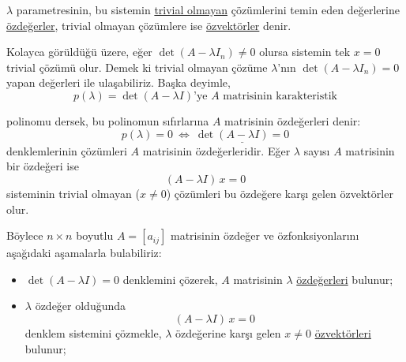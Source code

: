 \documentclass[11pt,a4paper]{article}
\begin{document}
$\lambda$ parametresinin, bu sistemin \underline{trivial olmayan} çözümlerini temin eden değerlerine
\underline{özdeğerler}, trivial olmayan çözümlere ise \underline{özvektörler} denir.

Kolayca görüldüğü üzere, eğer $\det(A-\lambda I_n)\neq 0$ olursa sistemin tek $x=0$ trivial çözümü olur.
Demek ki trivial olmayan çözüme $\lambda$'nın $\det(A-\lambda I_n)=0$ yapan değerleri ile ulaşabiliriz.
Başka deyimle,
\[ p(\lambda)=\det(A-\lambda I)\text{'ye } A \text{ matrisinin karakteristik} \]

polinomu dersek, bu polinomun sıfırlarına $A$ matrisinin özdeğerleri denir:
\[ p(\lambda)=0 \ \Leftrightarrow\ \underline{\det(A-\lambda I)=0} \]
denklemlerinin çözümleri $A$ matrisinin özdeğerleridir.
Eğer $\lambda$ sayısı $A$ matrisinin bir özdeğeri ise
\[ (A-\lambda I)\,x=0 \]
sisteminin trivial olmayan ($x\neq 0$) çözümleri bu özdeğere karşı gelen özvektörler olur.

Böylece $n\times n$ boyutlu $A=[a_{ij}]$ matrisinin özdeğer ve özfonksiyonlarını aşağıdaki aşamalarla bulabiliriz:
\begin{itemize}
  \item $\det(A-\lambda I)=0$ denklemini çözerek, $A$ matrisinin $\lambda$ \underline{özdeğerleri} bulunur;
  \item $\lambda$ özdeğer olduğunda
  \[ (A-\lambda I)\,x=0 \]
  denklem sistemini çözmekle, $\lambda$ özdeğerine karşı gelen $x\neq 0$ \underline{özvektörleri} bulunur;
\end{itemize}
\end{document}
